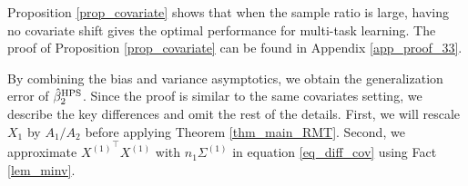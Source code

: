 \begin{example}
Proposition \ref{prop_covariate} shows that when the sample ratio is large, having no covariate shift gives the optimal performance for multi-task learning.
The proof of Proposition \ref{prop_covariate} can be found in Appendix \ref{app_proof_33}.
\end{example}

By combining the bias and variance asymptotics, we obtain the generalization error of $\hat{\beta}_2^{\textup{HPS}}$.
Since the proof is similar to the same covariates setting, we describe the key differences and omit the rest of the details.
First, we will rescale $X_1$ by $A_1 / A_2$ before applying Theorem \ref{thm_main_RMT}.
Second, we approximate ${X^{(1)}}^{\top}X^{(1)}$ with $n_1 \Sigma^{(1)}$ in equation \eqref{eq_diff_cov} using Fact \ref{lem_minv}.




